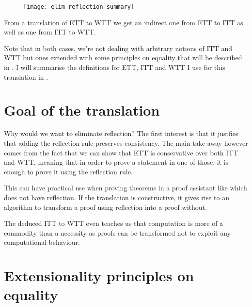 \begin{figure}[hb]
  \texttt{[image: elim-reflection-summary]}
\end{figure}

From a translation of \acrshort{ETT} to \acrshort{WTT} we get an indirect one
from \acrshort{ETT} to \acrshort{ITT} as well as one from \acrshort{ITT} to
\acrshort{WTT}.

Note that in both cases, we're not dealing with arbitrary notions of
\acrshort{ITT} and \acrshort{WTT} but ones extended with some principles on
equality that will be described in .
I will summarise the definitions for \acrshort{ETT}, \acrshort{ITT} and
\acrshort{WTT} I use for this translation in .

\section{Goal of the translation}

Why would we want to eliminate reflection? The first interest is that it
justfies that adding the reflection rule preserves consistency.
The main take-away however comes from the fact that we can show that
\acrshort{ETT} is conservative over both \acrshort{ITT} and \acrshort{WTT},
meaning that in order to prove a statement in one of those, it is enough
to prove it using the reflection rule.
%
%

This can have practical use when proving theorems in a proof assistant like \Coq
which does not have reflection. If the translation is constructive, it gives
rise to an algorithm to transform a proof using reflection into a proof without.

The deduced \acrshort{ITT} to \acrshort{WTT} even teaches us that computation
is more of a commodity than a necessity as proofs can be transformed not to
exploit any computational behaviour.

\section{Extensionality principles on equality}

